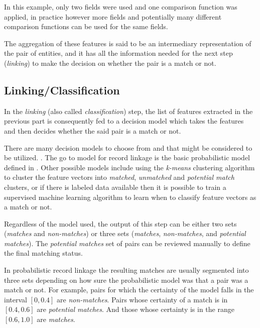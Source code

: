 \documentclass[epsfig,a4paper,11pt,titlepage,twoside,openany]{book}
\begin{document}
In this example, only two fields were used and one comparison function was applied, in practice
however more fields and potentially many different comparison
functions can be used for the same fields.

The aggregation of these features is said to be an intermediary representation
of the pair of entities, and it has all the information needed for the next step
(\textit{linking}) to make the decision on whether the pair is a match or not.

  
\subsection{Linking/Classification}
\label{sec:rl-workflow-linking}

In the \textit{linking} (also called \textit{classification}) step, the list of features extracted in the previous part is consequently fed to a decision model which takes the features and then decides whether the said pair is a match or not.

There are many decision models to choose from and that might be considered to be utilized. \cite{gu06_decis_model_recor_linkag}.
The go to model for record linkage is the basic probabilistic model defined in
\cite{fellegi69_theor_recor_linkag}. Other possible models \cite{Elfeky} include
using the \textit{k-means} \cite{Hartigan1979} clustering algorithm to cluster
the feature vectors into \textit{matched}, \textit{unmatched} and
\textit{potential match} clusters, or if there is labeled data available then
it is possible to train a supervised machine learning algorithm to learn when to classify
feature vectors as a match or not.

Regardless of the model used, the output of this step can be either two sets
(\textit{matches} and \textit{non-matches}) or three sets (\textit{matches},
\textit{non-matches}, and \textit{potential matches}). The \textit{potential matches} set of pairs can be reviewed manually to define the final matching
status.

In probabilistic record linkage \cite{fellegi69_theor_recor_linkag} the
resulting matches are usually segmented into three sets depending on how sure
the probabilistic model was that a pair was a match or not. For example, pairs
for which the certainty of the model falls in the interval $[0, 0.4]$ are
\textit{non-matches}. Pairs whose certainty of a match is in $[0.4, 0.6]$ are
\textit{potential matches}. And those whose certainty is in the range $[0.6,
1.0]$ are \textit{matches}.
\end{document}

